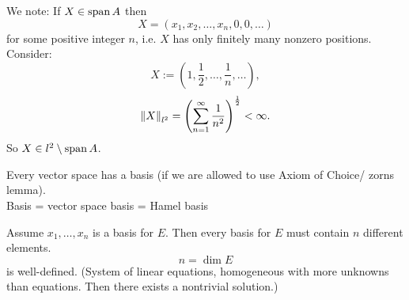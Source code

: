 \begin{beispiele}
\begin{enumerate}[(1)]
		We note: If $X \in \operatorname{span} A$ then
		\[
			X = (x_1,x_2, \dots,x_n,0,0,\dots)
		\]
		for some positive integer $n$, i.e. $X$ has only finitely many nonzero positions. \\
		Consider:
		\[
			X := (1, \frac{1}{2}, \dots, \frac{1}{n}, \dots),
		\]
		\[
			\norm{X}_{l^2} = \left( \sum_{n=1}^{\infty} \frac{1}{n^2} \right)^{\frac{1}{2}} < \infty.
		\]
		So $X \in l^2 \setminus \operatorname{span} A$.
		\end{enumerate}
		\begin{bemerkung}
			Every vector space has a basis (if we are allowed to use Axiom of Choice/ zorns lemma). \\ Basis = vector space basis = Hamel basis
		\end{bemerkung}
		Assume $x_1, \dots,x_n$ is a basis for $E$. Then every basis for $E$ must contain $n$ different elements. 
		\[
			n = \dim E
		\]
		is well-defined. (System of linear equations, homogeneous with more unknowns than equations. Then there exists a nontrivial solution.)
	\end{beispiele}
		
